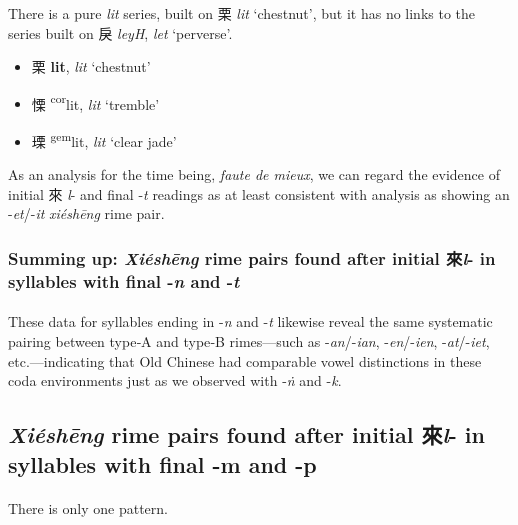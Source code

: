 There is a pure  \textit{lit} series, built on 栗 \textit{lit} `chestnut', but it has no links to the series built on  戾 \textit{leyH}, \textit{let} `perverse'. 

\begin{itemize}
  \item {\Large{栗}} %
    {\large{\textbf{lit}}},
    \textit{lit} `chestnut' %

  \item {\Large{慄}} %
    {\large{{\textsuperscript{cor}}lit}},
    \textit{lit} `tremble' %

  \item {\Large{瑮}} %
    {\large{{\textsuperscript{gem}}lit}},
    \textit{lit} `clear jade' %
\end{itemize}

\noindent As an analysis for the time being, \textit{faute de mieux}, we can regard the evidence of initial 來 \textit{l}- and final -\textit{t} readings as at least consistent with analysis as showing an -\textit{et}/-\textit{it}
\textit{xiéshēng} rime pair.


\subsubsection{Summing up: \textit{Xiéshēng} rime pairs found after initial 來\textit{l}- in syllables with final
-\textit{n} and
-\textit{t}}
\paragraph{}
These data for syllables ending in -\textit{n} and -\textit{t} likewise reveal the same systematic pairing between type‐A and type‐B rimes—such as -\textit{an}/-\textit{ian}, -\textit{en}/-\textit{ien}, -\textit{at}/-\textit{iet}, etc.—indicating that Old Chinese had comparable vowel distinctions in these coda environments just as we observed with -\textit{ṅ} and -\textit{k}.

\subsection{\textit{Xiéshēng} rime pairs found after initial 來\textit{l}- in syllables with final -m and -p}
\label{subsec:xiesheng_l_m_p}
\paragraph{} There is only one pattern. 

